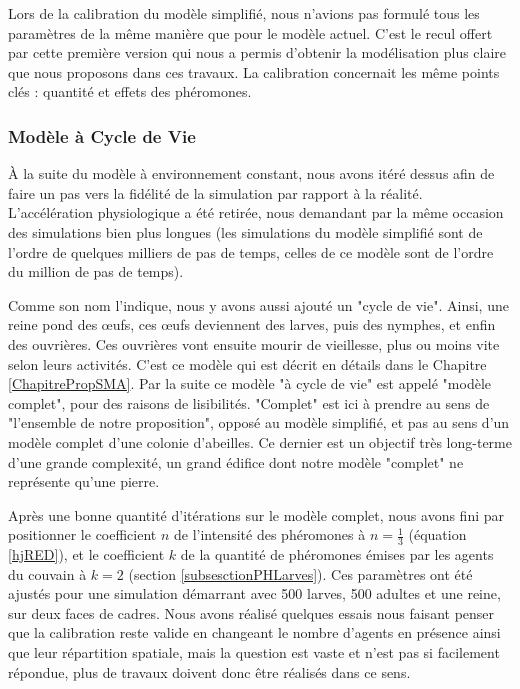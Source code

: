 			Lors de la calibration du modèle simplifié, nous n'avions pas formulé tous les paramètres de la même manière que pour le modèle actuel. C'est le recul offert par cette première version qui nous a permis d'obtenir la modélisation plus claire que nous proposons dans ces travaux. La calibration concernait les même points clés : quantité et effets des phéromones.
			
			
			\subsubsection{Modèle à Cycle de Vie}
			À la suite du modèle à environnement constant, nous avons itéré dessus afin de faire un pas vers la fidélité de la simulation par rapport à la réalité. L'accélération physiologique a été retirée, nous demandant par la même occasion des simulations bien plus longues (les simulations du modèle simplifié sont de l'ordre de quelques milliers de pas de temps, celles de ce modèle sont de l'ordre du million de pas de temps).
			
			Comme son nom l'indique, nous y avons aussi ajouté un "cycle de vie". Ainsi, une reine pond des œufs, ces œufs deviennent des larves, puis des nymphes, et enfin des ouvrières. Ces ouvrières vont ensuite mourir de vieillesse, plus ou moins vite selon leurs activités. C'est ce modèle qui est décrit en détails dans le Chapitre \ref{ChapitrePropSMA}.
			Par la suite ce modèle "à cycle de vie" est appelé "modèle complet", pour des raisons de lisibilités. "Complet" est ici à prendre au sens de "l'ensemble de notre proposition", opposé au modèle simplifié, et pas au sens d'un modèle complet d'une colonie d'abeilles. Ce dernier est un objectif très long-terme d'une grande complexité, un grand édifice dont notre modèle "complet" ne représente qu'une pierre.
			
			Après une bonne quantité d'itérations sur le modèle complet, nous avons fini par positionner le coefficient $n$ de l'intensité des phéromones à $n = \frac{1}{3}$ (équation \ref{hjRED}), et le coefficient $k$ de la quantité de phéromones émises par les agents du couvain à $k=2$ (section \ref{subsesctionPHLarves}). Ces paramètres ont été ajustés pour une simulation démarrant avec 500 larves, 500 adultes et une reine, sur deux faces de cadres. Nous avons réalisé quelques essais nous faisant penser que la calibration reste valide en changeant le nombre d'agents en présence ainsi que leur répartition spatiale, mais la question est vaste et n'est pas si facilement répondue, plus de travaux doivent donc être réalisés dans ce sens.
		
